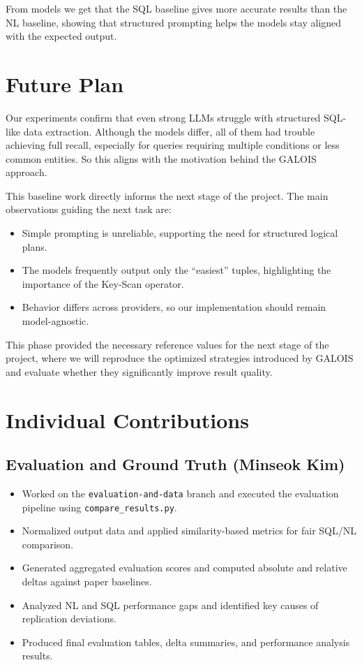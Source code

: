 \documentclass[12pt]{article}
\begin{document}
\noindent From models we get that the SQL baseline gives more accurate results than the NL baseline, showing that structured prompting helps the models stay aligned with the expected output.

\section{Future Plan}

Our experiments confirm that even strong LLMs struggle with structured SQL-like data extraction. Although the models differ, all of them had trouble achieving full recall, especially for queries requiring multiple conditions or less common entities. So this aligns with the motivation behind the GALOIS approach.

\noindent This baseline work directly informs the next stage of the project. The main observations guiding the next task are:

\begin{itemize}
    \item Simple prompting is unreliable, supporting the need for structured logical plans.
    \item The models frequently output only the ``easiest'' tuples, highlighting the importance of the Key-Scan operator.
    \item Behavior differs across providers, so our implementation should remain model-agnostic.
\end{itemize}

\noindent This phase provided the necessary reference values for the next stage of the project, where we will reproduce the optimized strategies introduced by GALOIS and evaluate whether they significantly improve result quality.

\section{Individual Contributions}

\subsection{Evaluation and Ground Truth (Minseok Kim)}
\begin{itemize}
    \item Worked on the \texttt{evaluation-and-data} branch and executed the evaluation pipeline using \texttt{compare\_results.py}.
    \item Normalized output data and applied similarity-based metrics for fair SQL/NL comparison.
    \item Generated aggregated evaluation scores and computed absolute and relative deltas against paper baselines.
    \item Analyzed NL and SQL performance gaps and identified key causes of replication deviations.
    \item Produced final evaluation tables, delta summaries, and performance analysis results.
\end{itemize}
\end{document}
